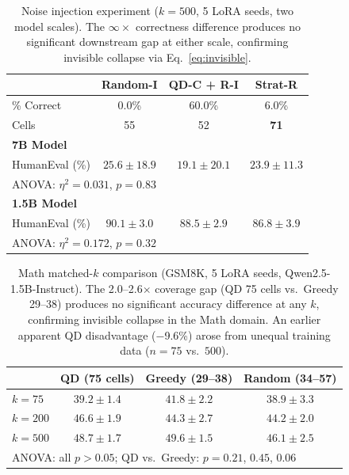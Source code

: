 \documentclass{article}
\begin{document}
\begin{enumerate}[nosep]
\begin{table}[t]
\centering
\caption{Noise injection experiment ($k{=}500$, 5 LoRA seeds, two model scales). The $\infty\times$ correctness difference produces no significant downstream gap at either scale, confirming invisible collapse via Eq.~\ref{eq:invisible}.}
\label{tab:noise}
\begin{tabular}{lccc}
\toprule
 & \textbf{Random-I} & \textbf{QD-C + R-I} & \textbf{Strat-R} \\
\midrule
\% Correct & 0.0\% & 60.0\% & 6.0\% \\
Cells & 55 & 52 & \textbf{71} \\
\midrule
\multicolumn{4}{l}{\textbf{7B Model}} \\
HumanEval (\%) & $25.6 \pm 18.9$ & $19.1 \pm 20.1$ & $23.9 \pm \mathbf{11.3}$ \\
\multicolumn{4}{l}{\footnotesize ANOVA: $\eta^2{=}0.031$, $p{=}0.83$} \\
\midrule
\multicolumn{4}{l}{\textbf{1.5B Model}} \\
HumanEval (\%) & $90.1 \pm \mathbf{3.0}$ & $88.5 \pm 2.9$ & $86.8 \pm 3.9$ \\
\multicolumn{4}{l}{\footnotesize ANOVA: $\eta^2{=}0.172$, $p{=}0.32$} \\
\bottomrule
\end{tabular}
\end{table}

\begin{table}[t]
\centering
\caption{Math matched-$k$ comparison (GSM8K, 5 LoRA seeds, Qwen2.5-1.5B-Instruct). The 2.0--2.6$\times$ coverage gap (QD 75 cells vs.\ Greedy 29--38) produces no significant accuracy difference at any $k$, confirming invisible collapse in the Math domain. An earlier apparent QD disadvantage ($-$9.6\%) arose from unequal training data ($n{=}75$ vs.\ $500$).}
\label{tab:math_matched_k}
\begin{tabular}{lccc}
\toprule
 & \textbf{QD (75 cells)} & \textbf{Greedy (29--38)} & \textbf{Random (34--57)} \\
\midrule
$k{=}75$ & $39.2 \pm 1.4$ & $41.8 \pm 2.2$ & $38.9 \pm 3.3$ \\
$k{=}200$ & $\mathbf{46.6 \pm 1.9}$ & $44.3 \pm 2.7$ & $44.2 \pm 2.0$ \\
$k{=}500$ & $48.7 \pm 1.7$ & $\mathbf{49.6 \pm 1.5}$ & $46.1 \pm 2.5$ \\
\midrule
\multicolumn{4}{l}{\footnotesize ANOVA: all $p{>}0.05$; QD vs.\ Greedy: $p{=}0.21$, $0.45$, $0.06$} \\
\bottomrule
\end{tabular}
\end{table}


\end{enumerate}
\end{document}
